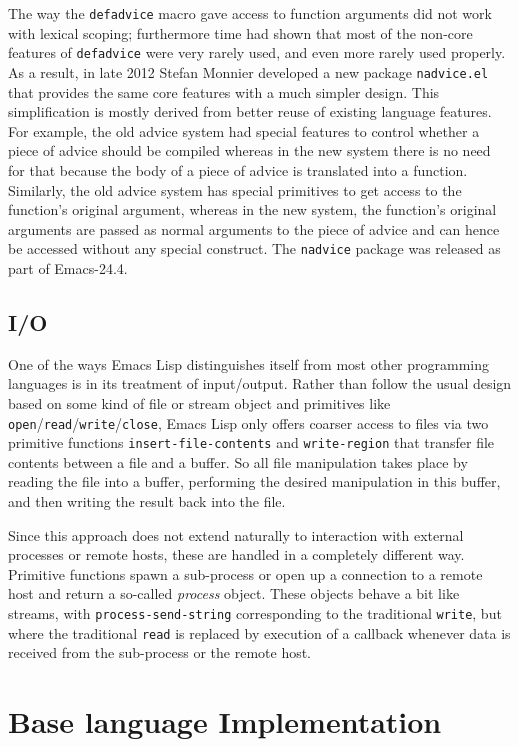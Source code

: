 \documentclass[format=acmsmall, review]{acmart}
\newcommand \Elisp {Emacs Lisp}
\begin{document}
The way the \texttt{defadvice} macro gave access to function arguments did
not work with lexical scoping; furthermore time had shown that most of the
non-core features of \texttt{defadvice} were very rarely used, and even more
rarely used properly.  As a result, in late 2012 Stefan Monnier developed a new
package \texttt{nadvice.el} that provides the same core features with a much
simpler design.  This simplification is mostly derived from better reuse of
existing language features.  For example, the old advice system had special
features to control whether a piece of advice should be compiled whereas in
the new system there is no need for that because the body of a piece of
advice is translated into a function.  Similarly, the old advice system
has special primitives to get access to the function's original argument,
whereas in the new system, the function's original arguments are passed as
normal arguments to the piece of advice and can hence be accessed without
any special construct.  The \texttt{nadvice} package was released as part of
Emacs-24.4.

\subsection{I/O}

One of the ways \Elisp{} distinguishes itself from most other programming
languages is in its treatment of input/output. Rather than follow the usual
design based on some kind of file or stream object and primitives like
\texttt{open}/\texttt{read}/\texttt{write}/\texttt{close}, \Elisp{} only
offers coarser access to files via two primitive functions
\texttt{insert-file-contents} and \texttt{write-region} that transfer file
contents between a file and a buffer.  So all file manipulation takes place
by reading the file into a buffer, performing the desired manipulation in
this buffer, and then writing the result back into the file.

Since this approach does not extend naturally to interaction with external
processes or remote hosts, these are handled in a completely different way.
Primitive functions spawn a sub-process or open up
a connection to a remote host and return a so-called \emph{process} object.
These objects behave  a bit like streams, with \texttt{process-send-string}
corresponding to the traditional \texttt{write}, but where the traditional
\texttt{read} is replaced by execution of a callback whenever data is
received from the sub-process or the remote host.

\section{Base language Implementation}
\label{sec:base-language-implementation}
\end{document}
